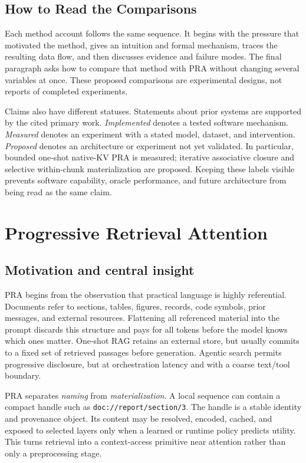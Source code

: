 \documentclass[10pt,a4paper]{article}
\begin{document}
\subsection{How to Read the Comparisons}
Each method account follows the same sequence. It begins with the pressure that motivated
the method, gives an intuition and formal mechanism, traces the resulting data flow, and
then discusses evidence and failure modes. The final paragraph asks how to compare that
method with PRA without changing several variables at once. These proposed comparisons
are experimental designs, not reports of completed experiments.

Claims also have different statuses. Statements about prior systems are supported by the
cited primary work. \emph{Implemented} denotes a tested software mechanism.
\emph{Measured} denotes an experiment with a stated model, dataset, and intervention.
\emph{Proposed} denotes an architecture or experiment not yet validated. In particular,
bounded one-shot native-KV PRA is measured; iterative associative closure and selective
within-chunk materialization are proposed. Keeping these labels visible prevents software
capability, oracle performance, and future architecture from being read as the same claim.

\section{Progressive Retrieval Attention}


\iffalse
\subsection{Motivation and central insight}
PRA begins from the observation that practical language is highly referential. Documents refer to sections, tables, figures, records, code symbols, prior messages, and external resources. Flattening all referenced material into the prompt discards this structure and pays for all tokens before the model knows which ones matter. One-shot RAG retains an external store, but usually commits to a fixed set of retrieved passages before generation. Agentic search permits progressive disclosure, but at orchestration latency and with a coarse text/tool boundary.

PRA separates \emph{naming} from \emph{materialization}. A local sequence can contain a compact handle such as \texttt{doc://report/section/3}. The handle is a stable identity and provenance object. Its content may be resolved, encoded, cached, and exposed to selected layers only when a learned or runtime policy predicts utility. This turns retrieval into a context-access primitive near attention rather than only a preprocessing stage.
\end{document}
